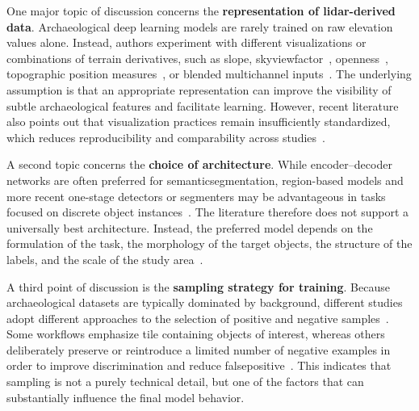 One major topic of discussion concerns the \textbf{representation of \gls{lidar}-derived data}. Archaeological deep learning models are rarely trained on raw elevation values alone. Instead, authors experiment with different visualizations or combinations of terrain derivatives, such as \gls{slope}, \gls{skyviewfactor}~\cite{zaksek_sky-view_2011}, openness~\cite{yokoyama_visualizing_2002,doneus_openness_2013}, topographic position measures~\cite{weiss2001topographic}, or blended multichannel inputs~\cite{kokalj_standardizing_2025,zhang_unveiling_2024,bundzel_semantic_2020}. The underlying assumption is that an appropriate representation can improve the visibility of subtle archaeological features and facilitate learning. However, recent literature also points out that visualization practices remain insufficiently standardized, which reduces reproducibility and comparability across studies~\cite{kokalj_standardizing_2025}.

A second topic concerns the \textbf{choice of architecture}. While encoder--decoder networks are often preferred for \gls{semanticsegmentation}, region-based models and more recent one-stage detectors or segmenters may be advantageous in tasks focused on discrete object instances~\cite{fiorucci_deep_2022,bundzel_semantic_2020}. The literature therefore does not support a universally best architecture. Instead, the preferred model depends on the formulation of the task, the morphology of the target objects, the structure of the labels, and the scale of the study area~\cite{fiorucci_deep_2022,trier_using_2019}.

A third point of discussion is the \textbf{sampling strategy for training}. Because archaeological datasets are typically dominated by background, different studies adopt different approaches to the selection of positive and negative samples~\cite{verschoof-van_der_vaart_combining_2020,trier_using_2019}. Some workflows emphasize tile containing objects of interest, whereas others deliberately preserve or reintroduce a limited number of negative examples in order to improve discrimination and reduce \gls{falsepositive}~\cite{verschoof-van_der_vaart_combining_2020}. This indicates that sampling is not a purely technical detail, but one of the factors that can substantially influence the final model behavior.

